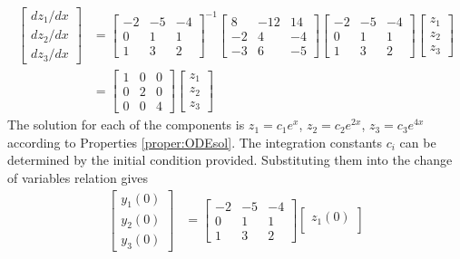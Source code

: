 \begin{solution}
\begin{align*}
\begin{bmatrix}
dz_1/dx \\
dz_2/dx \\
dz_3/dx
\end{bmatrix}
&=
\begin{bmatrix}
-2 & -5 & -4 \\
0 & 1 & 1 \\
1 & 3 & 2
\end{bmatrix}^{-1}
\begin{bmatrix}
8 & -12 & 14 \\
-2 & 4 & -4 \\
-3 & 6 & -5
\end{bmatrix}
\begin{bmatrix}
-2 & -5 & -4 \\
0 & 1 & 1 \\
1 & 3 & 2
\end{bmatrix}
\begin{bmatrix}
z_1 \\
z_2 \\
z_3
\end{bmatrix} \\
&=
\begin{bmatrix}
1 & 0 & 0\\
0 & 2 & 0\\
0 & 0 & 4
\end{bmatrix}
\begin{bmatrix}
z_1 \\
z_2 \\
z_3
\end{bmatrix}
\end{align*}
The solution for each of the components is $z_1 = c_1e^x$, $z_2 = c_2e^{2x}$, $z_3 = c_3e^{4x}$ according to Properties \ref{proper:ODEsol}. The integration constants $c_i$ can be determined by the initial condition provided. Substituting them into the change of variables relation gives
\begin{align*}
\begin{bmatrix}
y_1(0) \\
y_2(0) \\
y_3(0)
\end{bmatrix}
&=
\begin{bmatrix}
-2 & -5 & -4 \\
0 & 1 & 1 \\
1 & 3 & 2
\end{bmatrix}
\begin{bmatrix}
z_1(0) \\

\end{bmatrix}
\end{align*}
\end{solution}
